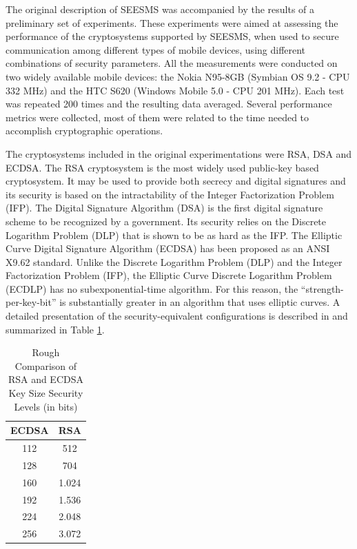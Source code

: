 \documentclass[authoryear]{elsarticle}
\begin{document}
The original description of SEESMS was accompanied by the results of a preliminary set of experiments. These experiments were aimed at assessing the performance of the cryptosystems supported by SEESMS, when used to secure communication among different types of mobile devices, using different combinations of security parameters. All the measurements were conducted on two widely available mobile devices: the Nokia N95-8GB (Symbian OS 9.2 - CPU 332 MHz) and the HTC S620 (Windows Mobile 5.0 - CPU 201 MHz). Each test was repeated 200 times and the resulting data averaged. Several performance metrics were collected, most of them were related to the time needed to accomplish cryptographic operations.

The cryptosystems included in the original experimentations were RSA, DSA and ECDSA. The RSA cryptosystem is the most widely used public-key based cryptosystem. It may be used to provide both secrecy and digital signatures and its security is based on the intractability of the Integer Factorization Problem (IFP). The Digital Signature Algorithm (DSA) is the first digital signature scheme to be recognized by a government. Its security relies on the Discrete Logarithm Problem (DLP) that is shown to be as hard as the IFP. The Elliptic Curve Digital Signature Algorithm (ECDSA) has been proposed as an ANSI X9.62 standard. Unlike the Discrete Logarithm Problem (DLP) and the Integer Factorization Problem (IFP), the Elliptic Curve Discrete Logarithm Problem (ECDLP) has no subexponential-time algorithm. For this reason, the ``strength-per-key-bit'' is substantially greater in an algorithm that uses elliptic curves.
A detailed presentation of the security-equivalent configurations is described in \citet{sec2} and summarized in Table \ref{table:secLevels}.

\begin{table}[ht]
\caption{Rough Comparison of RSA and ECDSA Key Size Security Levels
  (in bits)}
\centering %
\begin{tabular}{|c|c|} %
\hline\hline %
ECDSA & RSA \\ [0.5ex] %
\hline\hline %
112 & 512  \\ %
128 & 704  \\
160 & 1.024 \\
192 & 1.536 \\
224 & 2.048 \\
256 & 3.072 \\ [1ex] %
\hline %
\end{tabular}
\label{table:secLevels} %
\end{table}
\end{document}
